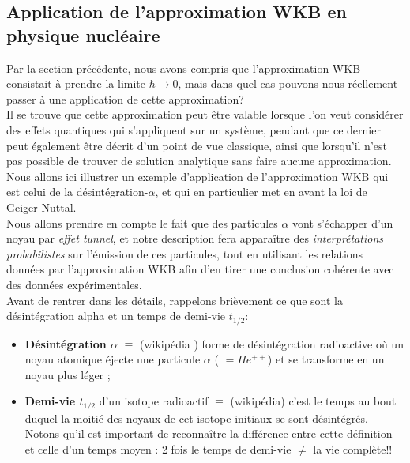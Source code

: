 \subsection{Application de l'approximation WKB en physique nucléaire}
Par la section précédente, nous avons compris que l'approximation WKB consistait à prendre la limite $\hbar \to 0$, mais dans quel cas pouvons-nous réellement passer à une application de cette approximation? \\
{\color{red}{Tentative d'explication mais le paragraphe en entier est à vérifier :}} Il se trouve que cette approximation peut être valable lorsque l'on veut considérer des effets quantiques qui s'appliquent sur un système, pendant que ce dernier peut également être décrit d'un point de vue classique, 
ainsi que lorsqu'il n'est pas possible de trouver de solution analytique sans faire aucune approximation. \\

Nous allons ici illustrer un exemple d'application de l'approximation WKB qui est celui de la désintégration-$\alpha$, et qui en particulier
met en avant la loi de Geiger-Nuttal. \\
Nous allons prendre en compte le fait que des particules $\alpha$ vont s'échapper d'un noyau par \textit{effet tunnel}, et notre description fera apparaître des \textit{interprétations probabilistes} sur l'émission de ces particules, 
tout en utilisant les relations données par l'approximation WKB afin d'en tirer une conclusion cohérente avec des données expérimentales. \\

Avant de rentrer dans les détails, rappelons brièvement ce que sont la désintégration alpha et un temps de demi-vie $t_{1/2}$: 
\begin{itemize}[label = \textbullet]
  \item \textbf{Désintégration $\alpha$} $\equiv$ (wikipédia {\color{red}{à vérifier}}) forme de désintégration radioactive où un noyau atomique éjecte une particule $\alpha$
  ( $= He^{++}$) et se transforme en un noyau plus léger ; 
  \item \textbf{Demi-vie $t_{1/2}$} d'un isotope radioactif $\equiv$ (wikipédia) c'est le temps au bout duquel la moitié des noyaux de cet isotope initiaux se sont désintégrés. \\
  Notons qu'il est important de reconnaître la différence entre cette définition et celle d'un temps moyen : 2 fois le temps de demi-vie $\ne$ la vie complète!!  
\end{itemize}

